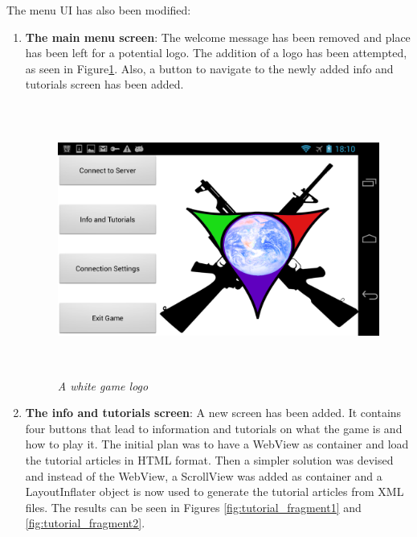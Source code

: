 The menu UI has also been modified:
\begin{enumerate}
  \item \textbf{The main menu screen}: The welcome message has been removed and
  place has been left for a potential logo. The addition of a logo has been
  attempted, as seen in Figure\ref{fig:logo_white}. Also, a button to navigate
  to the newly added info and tutorials screen has been added.
  
  \begin{figure}
  \includegraphics[height=3.5in,width=6.23in]{./images/android_screenshots/logo_white.png}
  \caption{\small \sl A white game logo \label{fig:logo_white}}
  \end{figure}
  
  \item \textbf{The info and tutorials screen}: A new screen has been added.
  It contains four buttons that lead to information and tutorials on what the
  game is and how to play it. The initial plan was to have a WebView as
  container and load the tutorial articles in HTML format. Then a simpler
  solution was devised and instead of the WebView, a ScrollView was added as
  container and a LayoutInflater object is now used to generate the
  tutorial articles from XML files. The results can be seen in Figures
  \ref{fig:tutorial_fragment1} and \ref{fig:tutorial_fragment2}.
  

\end{enumerate}
